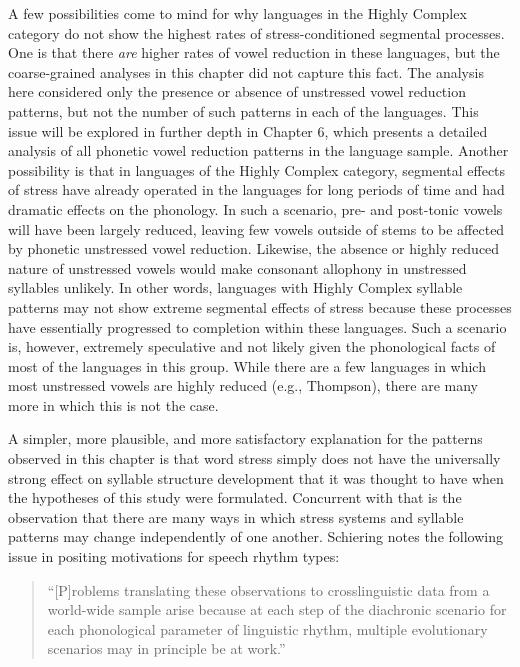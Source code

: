   A few possibilities come to mind for why languages in the Highly Complex category do not show the highest rates of stress-conditioned segmental processes. One is that there \textit{are} higher rates of vowel reduction in these languages, but the coarse-grained analyses in this chapter did not capture this fact. The analysis here considered only the presence or absence of unstressed vowel reduction patterns, but not the number of such patterns in each of the languages. This issue will be explored in further depth in Chapter 6, which presents a detailed analysis of all phonetic vowel reduction patterns in the language sample. Another possibility is that in languages of the Highly Complex category, segmental effects of stress have already operated in the languages for long periods of time and had dramatic effects on the phonology. In such a scenario, pre- and post-tonic vowels will have been largely reduced, leaving few vowels outside of stems to be affected by phonetic unstressed vowel reduction. Likewise, the absence or highly reduced nature of unstressed vowels would make consonant allophony in unstressed syllables unlikely. In other words, languages with Highly Complex syllable patterns may not show extreme segmental effects of stress because these processes have essentially progressed to completion within these languages. Such a scenario is, however, extremely speculative and not likely given the phonological facts of most of the languages in this group. While there are a few languages in which most unstressed vowels are highly reduced (e.g., Thompson), there are many more in which this is not the case.



  A simpler, more plausible, and more satisfactory explanation for the patterns observed in this chapter is that word stress simply does not have the universally strong effect on syllable structure development that it was thought to have when the hypotheses of this study were formulated. Concurrent with that is the observation that there are many ways in which stress systems and syllable patterns may change independently of one another. Schiering notes the following issue in positing motivations for speech rhythm types:

\begin{quote}
“[P]roblems translating these observations to crosslinguistic data from a world-wide sample arise because at each step of the diachronic scenario for each phonological parameter of linguistic rhythm, multiple evolutionary scenarios may in principle be at work.” 
\citep[353]{Schiering2007}
\end{quote}


